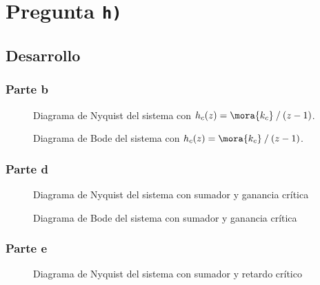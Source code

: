 \section{Pregunta \texttt{h)}}\label{pregunta-h}


\subsection{Desarrollo}

\subsubsection{Parte b}

\begin{figure}[h]
  \centering
  
  \caption{Diagrama de Nyquist del sistema con $h_{c}(z) = \mora{k_{c}}\mathbin{/}(z-1)$.}
  \label{fig:nyquist-h1}
\end{figure}

\begin{figure}[h]
  \centering
  
  \caption{Diagrama de Bode del sistema con $h_{c}(z) = \mora{k_{c}}\mathbin{/}(z-1)$.}
  \label{fig:bode-h1}
\end{figure}

\subsubsection{Parte d}

\begin{figure}[h]
  \centering
  
  \caption{Diagrama de Nyquist del sistema con sumador y ganancia crítica}
  \label{fig:nyquist-h2}
\end{figure}

\begin{figure}[h]
  \centering
  
  \caption{Diagrama de Bode del sistema con sumador y ganancia crítica}
  \label{fig:bode-h2}
\end{figure}

\subsubsection{Parte e}

\begin{figure}[h]
  \centering
  
  \caption{Diagrama de Nyquist del sistema con sumador y retardo crítico}
  \label{fig:nyquist-h3}
\end{figure}


